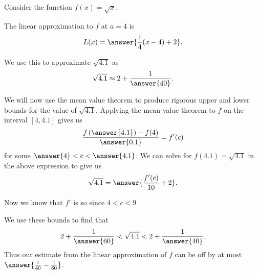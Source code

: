 \documentclass{ximera}
\author{Steven Gubkin}
\begin{document}
\begin{exercise}

Consider the function $f(x) = \sqrt{x}$.  

The linear approximation to $f$ at $a=4$ is
\[
L(x) = \answer{\frac{1}{4}(x-4) + 2}.
\]

We use this to approximate $\sqrt{4.1}$ as
\[
\sqrt{4.1} \approx 2 + \frac{1}{\answer{40}}.
\]

We will now use the mean value theorem to produce rigorous upper and lower bounds for the value of $\sqrt{4.1}$.  Applying the mean value theorem to $f$ on the interval $[4,4.1]$ gives us
\[
\frac{f\left(\answer{4.1}\right) - f(4)}{\answer{0.1}} = f'(c)
\]
for some $\answer{4}<c<\answer{4.1}$.  We can solve for $f(4.1) = \sqrt{4.1}$ in the above expression to give us
\[
\sqrt{4.1} = \answer{\frac{f'(c)}{10} + 2}.
\]

Now we know that $f'$ is  so since $4<c<9$
\begin{multipleChoice}
\end{multipleChoice}
We use these bounds to find that 
\[
2+\frac{1}{\answer{60}} < \sqrt{4.1} < 2+\frac{1}{\answer{40}}.
\]
Thus our estimate from the linear approximation of $f$ can be off by at most $\answer{\frac{1}{40}-\frac{1}{60}}$.

\end{exercise}
\end{document}
